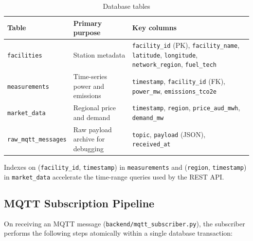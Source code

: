 \documentclass[11pt,a4paper]{article}
\begin{document}
\begin{table}[H]
\centering
\caption{Database tables}
\begin{tabular}{llp{6cm}}
\toprule
\textbf{Table} & \textbf{Primary purpose} & \textbf{Key columns} \\
\midrule
\texttt{facilities} & Station metadata & \texttt{facility\_id} (PK), \texttt{facility\_name}, \texttt{latitude}, \texttt{longitude}, \texttt{network\_region}, \texttt{fuel\_tech} \\
\texttt{measurements} & Time-series power and emissions & \texttt{timestamp}, \texttt{facility\_id} (FK), \texttt{power\_mw}, \texttt{emissions\_tco2e} \\
\texttt{market\_data} & Regional price and demand & \texttt{timestamp}, \texttt{region}, \texttt{price\_aud\_mwh}, \texttt{demand\_mw} \\
\texttt{raw\_mqtt\_messages} & Raw payload archive for debugging & \texttt{topic}, \texttt{payload} (JSON), \texttt{received\_at} \\
\bottomrule
\end{tabular}
\end{table}

Indexes on (\texttt{facility\_id}, \texttt{timestamp}) in \texttt{measurements} and (\texttt{region}, \texttt{timestamp}) in \texttt{market\_data} accelerate the time-range queries used by the REST API.

\subsection{MQTT Subscription Pipeline}

On receiving an MQTT message (\texttt{backend/mqtt\_subscriber.py}), the subscriber performs the following steps atomically within a single database transaction:
\end{document}
